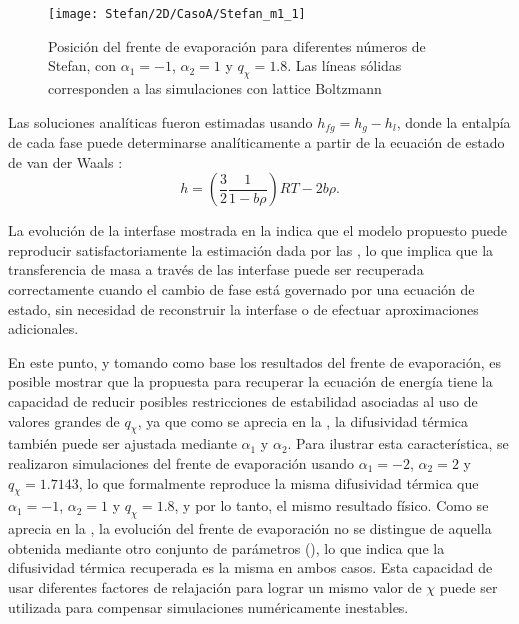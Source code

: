 \begin{figure}[ht]
	\centering
	\texttt{[image: Stefan/2D/CasoA/Stefan\_m1\_1]}
	\caption{Posici\'on del frente de evaporaci\'on para diferentes n\'umeros de Stefan, con $\alpha_1 = -1$, $\alpha_2=1$ y $q_{\chi} = 1.8$. Las l\'ineas s\'olidas corresponden a las simulaciones con lattice Boltzmann}
	\label{fig:Stefan_m1_1}
\end{figure}

Las soluciones anal\'iticas fueron estimadas usando $h_{fg}=h_g-h_l$, donde la entalp\'ia de cada fase puede determinarse anal\'iticamente a partir de la ecuaci\'on de estado de van der Waals \cite{markus_simulation_2011}:
\begin{equation}
	h = \left( \dfrac{3}{2} \dfrac{1}{1-b\rho} \right)RT - 2b\rho.
	\label{eq:hfg_vdw}
\end{equation}

La evoluci\'on de la interfase mostrada en la  indica que el modelo propuesto puede reproducir satisfactoriamente la estimaci\'on dada por las , lo que implica que la transferencia de masa a trav\'es de las interfase puede ser recuperada correctamente cuando el cambio de fase est\'a governado por una ecuaci\'on de estado, sin necesidad de reconstruir la interfase o de efectuar aproximaciones adicionales.

En este punto, y tomando como base los resultados del frente de evaporaci\'on, es posible mostrar que la \lbe{} propuesta para recuperar la ecuaci\'on de energ\'ia tiene la capacidad de reducir posibles restricciones de estabilidad asociadas al uso de valores grandes de $q_{\chi}$, ya que como se aprecia en la , la difusividad t\'ermica tambi\'en puede ser ajustada mediante $\alpha_1$ y $\alpha_2$. Para ilustrar esta caracter\'istica, se realizaron simulaciones del frente de evaporaci\'on usando $\alpha_1=-2$, $\alpha_2=2$ y $q_{\chi}=1.7143$, lo que formalmente reproduce la misma difusividad t\'ermica que $\alpha_1=-1$, $\alpha_2=1$ y $q_{\chi}=1.8$, y por lo tanto, el mismo resultado f\'isico. Como se aprecia en la , la evoluci\'on del frente de evaporaci\'on no se distingue de aquella obtenida mediante otro conjunto de par\'ametros (), lo que indica que la difusividad t\'ermica recuperada es la misma en ambos casos. Esta capacidad de usar diferentes factores de relajaci\'on para lograr un mismo valor de $\chi$ puede ser utilizada para compensar simulaciones num\'ericamente inestables.

